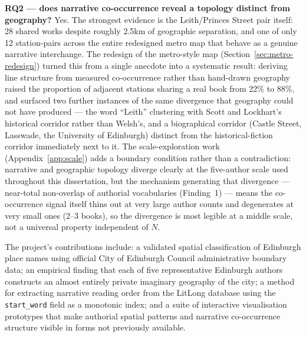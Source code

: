 \documentclass[logo,msc]{infthesis}
\begin{document}
\textbf{RQ2 --- does narrative co-occurrence reveal a topology distinct from geography?} Yes. The strongest evidence is the Leith/Princes Street pair itself: 28 shared works despite roughly 2.5km of geographic separation, and one of only 12 station-pairs across the entire redesigned metro map that behave as a genuine narrative interchange. The redesign of the metro-style map (Section~\ref{sec:metro-redesign}) turned this from a single anecdote into a systematic result: deriving line structure from measured co-occurrence rather than hand-drawn geography raised the proportion of adjacent stations sharing a real book from 22\% to 88\%, and surfaced two further instances of the same divergence that geography could not have produced --- the word ``Leith'' clustering with Scott and Lockhart's historical corridor rather than Welsh's, and a biographical corridor (Castle Street, Lasswade, the University of Edinburgh) distinct from the historical-fiction corridor immediately next to it. The scale-exploration work (Appendix~\ref{app:scale}) adds a boundary condition rather than a contradiction: narrative and geographic topology diverge clearly at the five-author scale used throughout this dissertation, but the mechanism generating that divergence --- near-total non-overlap of authorial vocabularies (Finding~1) --- means the co-occurrence signal itself thins out at very large author counts and degenerates at very small ones (2--3 books), so the divergence is most legible at a middle scale, not a universal property independent of $N$.

 
The project's contributions include: a validated spatial classification of Edinburgh place names using official City of Edinburgh Council administrative boundary data; an empirical finding that each of five representative Edinburgh authors constructs an almost entirely private imaginary geography of the city; a method for extracting narrative reading order from the LitLong database using the \texttt{start\_word} field as a monotonic index; and a suite of interactive visualisation prototypes that make authorial spatial patterns and narrative co-occurrence structure visible in forms not previously available.
 
\end{document}
